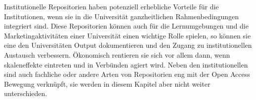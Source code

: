 Institutionelle Repositorien haben potenziell erhebliche Vorteile für die Institutionen, wenn sie in die Universität ganzheitlichen Rahmenbedingungen integriert sind\cite{steele_2006}. Diese Repositorien können auch für die Lernumgebungen und die Marketingaktivitäten einer Universität einen wichtige Rolle spielen, so können sie eine den Universitäten Output dokumentieren und den Zugang zu institutionellen Austausch verbessern\cite{steele_2006}. Ökonomisch rentieren sie sich vor allem dann, wenn skaleneffekte eintreten und in Verbünden agiert wird.\cite{blythe_2005value} Neben den institutionellen sind auch fachliche oder andere Arten von Repositorien eng mit der Open Access Bewegung verknüpft, sie werden in diesem Kapitel aber nicht weiter unterschieden.